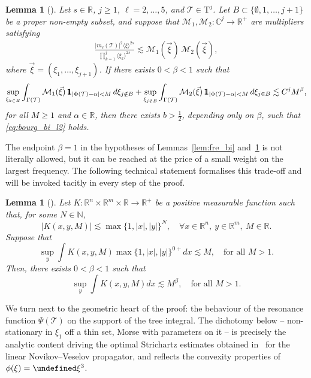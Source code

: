 \documentclass[a4paper,
11pt,  reqno]{amsart}
\newcommand{\mathbbm}[1]{\mathchoice%
    {\hbox{\sffamily 1\kern-.40em 1}}%
    {\hbox{\sffamily 1\kern-.40em 1}}%
    {\hbox{\scriptsize\sffamily 1\kern-.30em 1}}%
    {\hbox{\tiny\sffamily 1\kern-.25em 1}}}%
\newcommand{\jap}[1]{\langle #1 \rangle}
\newcommand{\5}{\textup{V}}
\newcommand{\les}{\lesssim}
\newtheorem{lemma}[theorem]{Lemma}
\theoremstyle{remark}
\newcommand{\R}{\mathbb{R}}
\newcommand{\CC}{\mathbb{C}}
\let\Re=\undefined\DeclareMathOperator*{\Re}{Re}
\newcommand{\TT}{\mathcal{T}}
\newcommand{\Tr}{\mathrm{T}}
\newcommand{\al}{\alpha}
\newcommand{\be}{\beta}
\newcommand{\M}{\mathcal{M}}
\numberwithin{equation}{section}
\numberwithin{theorem}{section}
\begin{document}
\begin{lemma}[{\cite[Lemma 2]{COS}}]\label{lem:fre_tri}
Let $s\in\R$, $j\ge 1$, $\ell=2,\dots,5$, and $\TT\in \Tr^j$. Let $B\subset \{\emptyset, 1, \ldots, j+1\}$ be a proper non-empty subset, and suppose that $\M_1, \M_2:\CC^{j} \to \R^+$ are multipliers satisfying
\begin{align}
\frac{|m_\ell(\TT)|^2\jap{\xi}^{2s}}{\prod_{k=1}^j\jap{\xi_{k}}^{2s}}
\les
\M_1(\vec\xi)\,\M_2(\vec\xi),
\end{align}
where $\vec\xi=(\xi_1, \ldots, \xi_{j+1})$.
If there exists $0<\be<1$ such that
\begin{equation}\label{L2hypo}
\sup_{\xi_{k\in B}} \int_{\Gamma(\TT)} \mathcal{M}_1 (\vec\xi)\, \mathbbm{1}_{|\Phi(\TT)-\alpha|<M} \,d\xi_{j\notin B}
+ \sup_{\xi_{j\notin B}} \int_{\Gamma(\TT)} \mathcal{M}_2 (\vec\xi)\, \mathbbm{1}_{|\Phi(\TT)-\alpha|<M} \,d\xi_{j\in B}
\lesssim C^j M^\beta,
\end{equation}
for all $M\ge 1$ and $\al\in\R$,
then there exists $b>\frac12$, depending only on $\be$, such that \eqref{eq:bourg_bi_l2} holds.
\end{lemma}

The endpoint $\beta=1$ in the hypotheses of Lemmas~\ref{lem:fre_bi} and~\ref{lem:fre_tri} is not literally allowed, but it can be reached at the price of a small weight on the largest frequency. The following technical statement formalises this trade-off and will be invoked tacitly in every step of the proof.

\begin{lemma}[{\cite[Lemma 3.3]{CLS}}]\label{lem:eta1}
    Let $K:\R^n\times \R^m\times \R\to \R^+$ be a positive measurable function such that, for some $N\in \mathbb{N}$,
    $$
    |K(x,y,M)|\lesssim \max\{1,|x|,|y|\}^N,\quad \forall x\in\R^n,\ y\in \R^m, \ M\in \R.
    $$
    Suppose that
    $$
    \sup_y \int K(x,y,M)\max\{1,|x|,|y|\}^{0+} dx \lesssim M,\quad \mbox{for all }M>1.
    $$
    Then, there exists $0<\beta<1$ such that
    $$
    \sup_y \int K(x,y,M) dx \lesssim M^{\beta},\quad \mbox{for all } M>1.
    $$
\end{lemma}

We turn next to the geometric heart of the proof: the behaviour of the resonance function $\Psi(\TT)$ on the support of the tree integral. The dichotomy below -- non-stationary in $\xi_1$ off a thin set, Morse with parameters on it -- is precisely the analytic content driving the optimal Strichartz estimates obtained in~\cite{kazeykinamunoz1, kazeykinamunoz2} for the linear Novikov--Veselov propagator, and reflects the convexity properties of $\phi(\xi)=\Re\xi^3$.
\end{document}
